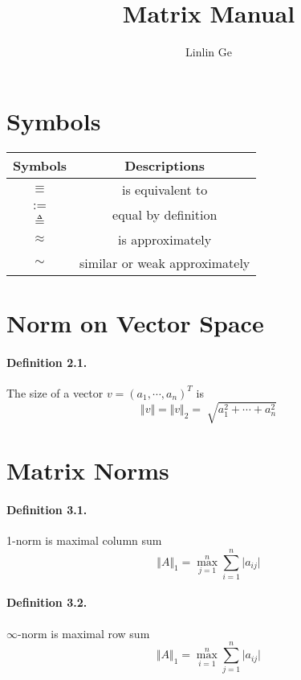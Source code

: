\documentclass[10pt]{article}
\title{Matrix Manual}
\author{Linlin Ge}
\date{}
\begin{document}
\maketitle

\section{Symbols}
\begin{table}[H]
\begin{center}
\begin{tabular}{|c|c|}
\hline
Symbols & Descriptions \\
\hline
$\equiv$ & is equivalent to \\
\hline
$:=$ & \multirow{2}{*}{ equal by definition}\\
\cline{1-1}
$\triangleq$ & ~\\
\hline
$\approx$ & is approximately\\
\hline
$\sim$ & similar or weak approximately\\
\hline
\end{tabular}
\end{center}
\end{table}

\section{Norm on Vector Space}
\paragraph{Definition 2.1.} The size of a vector $v=(a_1,\cdots,a_n)^T$ is
\begin{equation}
\Vert v \Vert = \Vert v \Vert_2 =\sqrt[]{a_1^2+ \cdots + a_n^2}
\end{equation}

\section{Matrix Norms}
\paragraph{Definition 3.1.} 1-norm is maximal column sum
\begin{equation}
\Vert A \Vert_1= \max_{j=1}^n \sum_{i=1}^n \vert a_{ij} \vert
\end{equation}

\paragraph{Definition 3.2.} $\infty$-norm is maximal row sum
\begin{equation}
\Vert A \Vert_1 = \max_{i=1}^n \sum_{j=1}^n \vert a_{ij} \vert
\end{equation}
\end{document}
